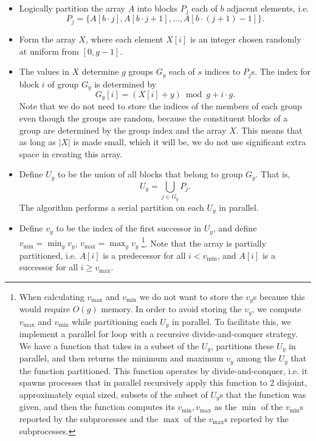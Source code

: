 \documentclass[twocolumn, twoside, 11pt]{article}
\begin{document}
\begin{itemize}
	\item Logically partition the array $A$ into blocks $P_j$ each of $b$ adjacent elements, i.e. $${P_j = \{A[b\cdot j], A[b\cdot j + 1], \ldots, A[b\cdot (j+1)-1]\}}.$$
	\item Form the array $X$, where each element $X[i]$ is an integer chosen randomly at uniform from $[0, g-1].$
	\item The values in $X$ determine $g$ groups $G_y$ each of $s$ indices to $P_j$s. The index for block $i$ of group $G_y$ is determined by
		$$G_y[i] = (X[i] + y) \bmod g + i\cdot g.$$
		Note that we do not need to store the indices of the members of each group even though the groups are random, because the constituent blocks of a group are determined by the group index and the array $X$. 
		This means that as long as $|X|$ is made small, which it will be, we do not use significant extra space in creating this array.  
	\item Define $U_y$ to be the union of all blocks that belong to group $G_y$. That is,
			$$U_y = \bigcup_{j\in G_y} P_j.$$ 
		The algorithm performs a serial partition on each $U_y$ in parallel.
	\item Define $v_y$ to be the index of the first successor in $U_y$, and define $v_{\text{min}}=\min_y{v_y}$,  $v_{\text{max}}=\max_y{v_y}$
		\footnote{When calculating $v_{\text{max}}$ and $v_{\text{min}}$ we do not want to store the $v_y$s because this would require $O(g)$ memory. 
In order to avoid storing the $v_y$, we compute $v_{\text{max}}$ and $v_{\text{min}}$ while partitioning each $U_y$ in parallel.
To facilitate this, we implement a parallel for loop with a recursive divide-and-conquer strategy. 
We have a function that takes in a subset of the $U_y$, partitions these $U_y$ in parallel, and then returns the minimum and maximum $v_y$ among the $U_y$ that the function partitioned.
This function operates by divide-and-conquer, i.e. it spawns processes that in parallel recursively apply this function to 2 disjoint, approximately equal sized, subsets of the subset of $U_y$s that the function was given, and then the function computes its $v_{\text{min}}, v_{\text{max}}$ as the $\min$ of the $v_{\text{min}}$s reported by the subprocesses and the $\max$ of the $v_{\text{max}}$s reported by the subprocesses.}. 
Note that the array is partially partitioned, i.e. $A[i]$ is a predecessor for all $i < v_{\text{min}}$, and $A[i]$ is a successor for all $i \ge v_\text{max}$.
\end{itemize}
\end{document}
